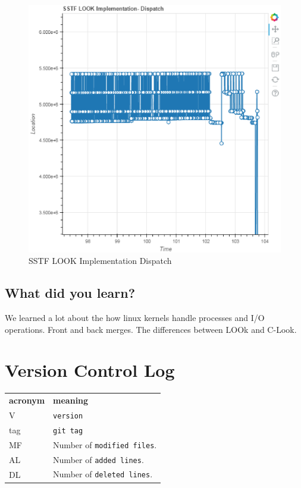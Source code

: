 \documentclass[letterpaper,10pt,titlepage, onecolumn, compsoc]{IEEEtran}
\begin{document}
\begin{figure}[b]
	\centering
      \includegraphics[]{afe.eps}
    \caption{SSTF LOOK Implementation Dispatch}
    \label{fig:output1}
\end{figure}
    

\subsection{What did you learn?}
We learned a lot about the how linux kernels handle processes and I/O operations. Front and back merges. The differences between LOOk and C-Look. 

\section{Version Control Log}
\begin{tabular}{lp{12cm}}
  \label{tabular:legend:git-log}
  \textbf{acronym} & \textbf{meaning} \\
  V & \texttt{version} \\
  tag & \texttt{git tag} \\
  MF & Number of \texttt{modified files}. \\
  AL & Number of \texttt{added lines}. \\
  DL & Number of \texttt{deleted lines}. \\
\end{tabular}
\end{document}
